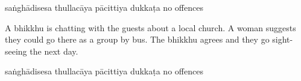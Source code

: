 \begin{exam}{\autoExamName}
\begin{problem*}
\begin{parts}
  \bigskip

  \begin{answers}{5}
    \bChoices
     saṅghādisesa\eAns
     thullacāya\eAns
     pācittiya\eAns
     dukkaṭa\eAns
     no offences\eAns
    \eChoices
  \end{answers}

  \bigskip

\item A bhikkhu is chatting with the guests about a local church. A woman
  suggests they could go there as a group by bus. The bhikkhu agrees and they go
  sight-seeing the next day.

  \bigskip

  \begin{answers}{5}
    \bChoices
     saṅghādisesa\eAns
     thullacāya\eAns
     pācittiya\eAns
     dukkaṭa\eAns
     no offences\eAns
    \eChoices
  \end{answers}

\end{parts}

\end{problem*}

\end{exam}
